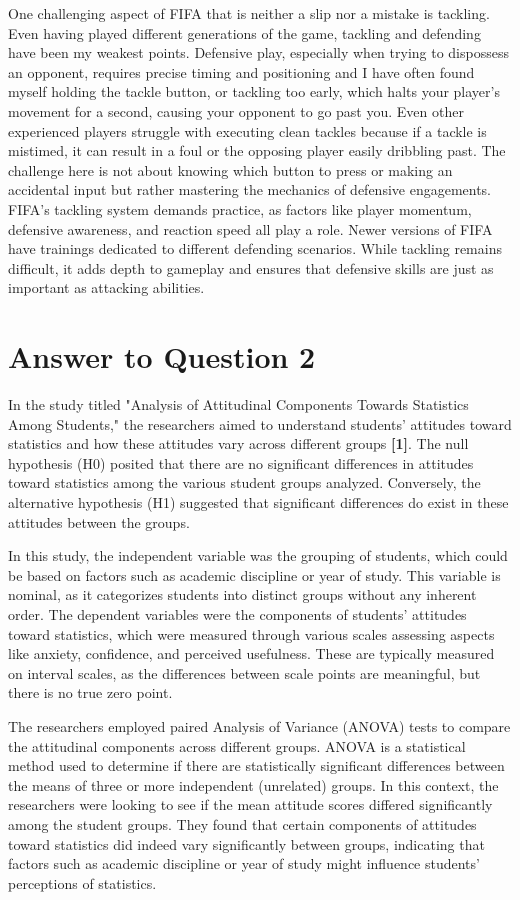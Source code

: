 \documentclass[
	letterpaper, %
]{jdf}
\begin{document}
One challenging aspect of FIFA that is neither a slip nor a mistake is tackling. Even having played different generations of the game, tackling and defending have been my weakest points. Defensive play, especially when trying to dispossess an opponent, requires precise timing and positioning and I have often found myself holding the tackle button, or tackling too early, which halts your player's movement for a second, causing your opponent to go past you. Even other experienced players struggle with executing clean tackles because if a tackle is mistimed, it can result in a foul or the opposing player easily dribbling past. The challenge here is not about knowing which button to press or making an accidental input but rather mastering the mechanics of defensive engagements. FIFA’s tackling system demands practice, as factors like player momentum, defensive awareness, and reaction speed all play a role. Newer versions of FIFA have trainings dedicated to different defending scenarios. While tackling remains difficult, it adds depth to gameplay and ensures that defensive skills are just as important as attacking abilities.
\newpage

\section{Answer to Question 2}
In the study titled "Analysis of Attitudinal Components Towards Statistics Among Students," the researchers aimed to understand students' attitudes toward statistics and how these attitudes vary across different groups \textbf{[1]}. The null hypothesis (H0) posited that there are no significant differences in attitudes toward statistics among the various student groups analyzed. Conversely, the alternative hypothesis (H1) suggested that significant differences do exist in these attitudes between the groups.

In this study, the independent variable was the grouping of students, which could be based on factors such as academic discipline or year of study. This variable is nominal, as it categorizes students into distinct groups without any inherent order. The dependent variables were the components of students' attitudes toward statistics, which were measured through various scales assessing aspects like anxiety, confidence, and perceived usefulness. These are typically measured on interval scales, as the differences between scale points are meaningful, but there is no true zero point.

The researchers employed paired Analysis of Variance (ANOVA) tests to compare the attitudinal components across different groups. ANOVA is a statistical method used to determine if there are statistically significant differences between the means of three or more independent (unrelated) groups. In this context, the researchers were looking to see if the mean attitude scores differed significantly among the student groups. They found that certain components of attitudes toward statistics did indeed vary significantly between groups, indicating that factors such as academic discipline or year of study might influence students' perceptions of statistics.
\end{document}
